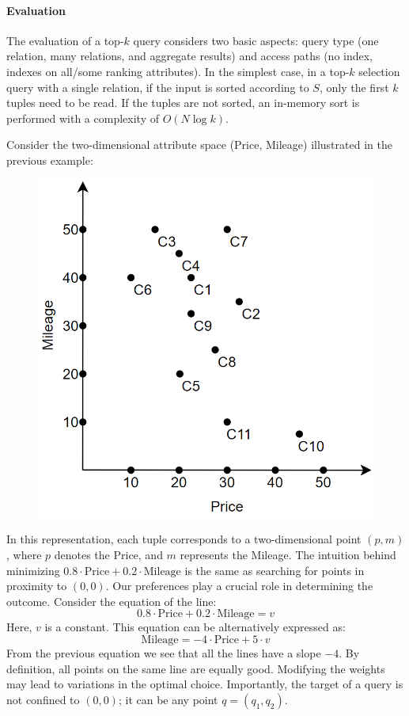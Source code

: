 \paragraph*{Evaluation}
The evaluation of a top-$k$ query considers two basic aspects: query type (one relation, many relations, and aggregate results) and access paths (no index, indexes on all/some ranking attributes).
In the simplest case, in a top-$k$ selection query with a single relation, if the input is sorted according to $S$, only the first $k$ tuples need to be read.
If the tuples are not sorted, an in-memory sort is performed with a complexity of $O(N\log{k})$.
\begin{example}
    Consider the two-dimensional attribute space (Price, Mileage) illustrated in the previous example:
    \begin{figure}[H]
        \centering
        \includegraphics[width=0.2\linewidth]{images/ex1.png}
    \end{figure}
    In this representation, each tuple corresponds to a two-dimensional point $(p, m)$, where $p$ denotes the Price, and $m$ represents the Mileage. 
    The intuition behind minimizing $0.8 \cdot \text{Price} + 0.2 \cdot \text{Mileage}$ is the same as searching for points in proximity to $(0,0)$.
    Our preferences play a crucial role in determining the outcome. 
    Consider the equation of the line:
    \[0.8\cdot \text{Price} + 0.2\cdot \text{Mileage} = v\]
    Here, $v$ is a constant. 
    This equation can be alternatively expressed as:
    \[\text{Mileage} = -4\cdot \text{Price} + 5\cdot v\]
    From the previous equation we see that all the lines have a slope $-4$. 
    By definition, all points on the same line are equally good. 
    Modifying the weights may lead to variations in the optimal choice. 
    Importantly, the target of a query is not confined to $(0,0)$; it can be any point $q=(q_1,q_2)$.
\end{example}


